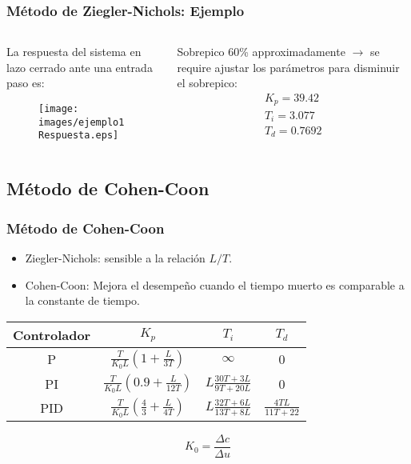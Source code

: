 \documentclass[aspectratio=169]{beamer}
\theoremstyle{definition}
\theoremstyle{plain}
\theoremstyle{remark}
\begin{document}
\begin{frame}[<+->]\frametitle{Método de Ziegler-Nichols: Ejemplo}
\vspace*{5mm}
\begin{columns}
\begin{column}{0.5\textwidth}
	La respuesta del sistema en lazo cerrado ante una entrada paso es:
	\begin{figure}
		\texttt{[image: images/ejemplo1Respuesta.eps]}
	\end{figure}
\end{column}	
\pause
\begin{column}{0.5\textwidth}
	Sobrepico 60\% approximadamente $\rightarrow$ se require ajustar los parámetros para disminuir el sobrepico:
	\begin{align*}
		K_p = 39.42\\
		T_i = 3.077\\
		T_d = 0.7692
	\end{align*}
\end{column}	
\end{columns}
\end{frame}

\subsection{Método de Cohen-Coon}
\begin{frame}[<+->]\frametitle{Método de Cohen-Coon}
  \begin{itemize}
 		\item Ziegler-Nichols: sensible a la relación $L/T$.
   	\item Cohen-Coon: Mejora el desempeño cuando el tiempo muerto es comparable a la constante de tiempo.
  \end{itemize}
  \begin{table}
  	\begin{tabular}{c|c|c|c}
  		Controlador & $K_p$ & $T_i$ & $T_d$\\
  		\hline
  		P   & $\frac{T}{K_0 L}\left(1   + \frac{L}{3T} \right)$ & $\infty$ & 0\\
  		PI  & $\frac{T}{K_0 L}\left(0.9 + \frac{L}{12T} \right)$ & $L \frac{30T+3L}{9T+20L}$ & 0\\
  		PID & $\frac{T}{K_0 L}\left(\frac{4}{3} + \frac{L}{4T} \right)$ & $L \frac{32T+6L}{13T+8L}$ & $\frac{4TL}{11T+22}$
  	\end{tabular}
  \end{table}
  \begin{equation*}
  	K_0 = \frac{\Delta c}{\Delta u}
  \end{equation*}
\end{frame}
\end{document}
